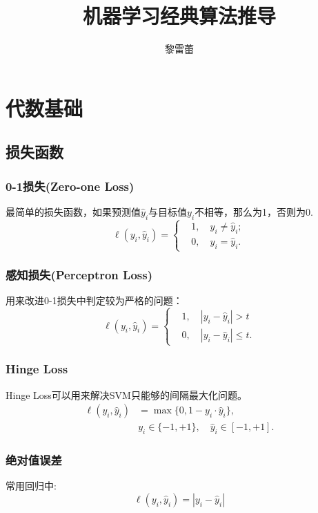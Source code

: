 \documentclass[11pt]{report}
\title{机器学习经典算法推导}
\author{黎雷蕾}
\begin{document}
\maketitle
\tableofcontents
\chapter{代数基础}
\section{损失函数}
\subsection{0-1损失(Zero-one Loss)}
最简单的损失函数，如果预测值$\hat{y}_i$与目标值$y_i$不相等，那么为1，否则为0.
\begin{equation}
	\ell(y_i,\hat{y}_i)=
	\begin{cases}
		&1,\quad y_i\neq\hat{y}_i;\\
		&0,\quad y_i=\hat{y}_i.
	\end{cases}
\end{equation}
\subsection{感知损失(Perceptron Loss)}
用来改进0-1损失中判定较为严格的问题：
\begin{equation}
	\ell(y_i,\hat{y}_i)=
	\begin{cases}
		&1,\quad |y_i-\hat{y}_i|>t\\
		&0,\quad |y_i-\hat{y}_i|\leq t.
	\end{cases}
\end{equation}
\subsection{Hinge Loss}
Hinge Loss可以用来解决SVM只能够的间隔最大化问题。
\begin{equation}
\begin{split}
	\ell(y_i,\hat{y}_i)&=\max\{0,1-y_i\cdot\hat{y}_i\},\\
	&y_i\in\{-1,+1\}, \quad \hat{y}_i\in[-1,+1].
\end{split}
\end{equation}
\subsection{绝对值误差}
常用回归中:
\begin{equation}
	\ell(y_i,\hat{y}_i)=|y_i-\hat{y}_i|
\end{equation}
\end{document}
